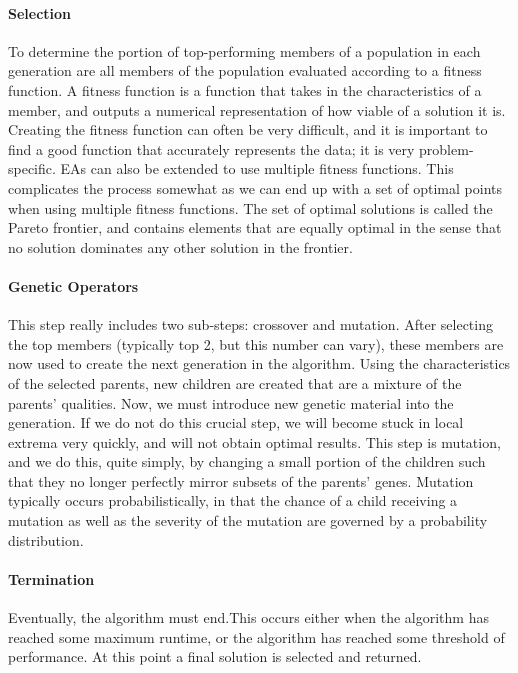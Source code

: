 \documentclass[journal, a4paper]{IEEEtran}
\begin{document}
\paragraph{Selection}
To determine the portion of top-performing members of a population in each generation are all members of the population evaluated according to a fitness function. A fitness function is a function that takes in the characteristics of a member, and outputs a numerical representation of how viable of a solution it is. Creating the fitness function can often be very difficult, and it is important to find a good function that accurately represents the data; it is very problem-specific. EAs can also be extended to use multiple fitness functions. This complicates the process somewhat as we can end up with a set of optimal points when using multiple fitness functions. The set of optimal solutions is called the Pareto frontier, and contains elements that are equally optimal in the sense that no solution dominates any other solution in the frontier. \cite{cite04}

\paragraph{Genetic Operators}
This step really includes two sub-steps: crossover and mutation. After selecting the top members (typically top 2, but this number can vary), these members are now used to create the next generation in the algorithm. Using the characteristics of the selected parents, new children are created that are a mixture of the parents’ qualities. 
Now, we must introduce new genetic material into the generation. If we do not do this crucial step, we will become stuck in local extrema very quickly, and will not obtain optimal results. This step is mutation, and we do this, quite simply, by changing a small portion of the children such that they no longer perfectly mirror subsets of the parents’ genes. Mutation typically occurs probabilistically, in that the chance of a child receiving a mutation as well as the severity of the mutation are governed by a probability distribution. \cite{cite04}

\paragraph{Termination}
Eventually, the algorithm must end.This occurs either when the algorithm has reached some maximum runtime, or the algorithm has reached some threshold of performance. At this point a final solution is selected and returned. \cite{cite04}
\end{document}
